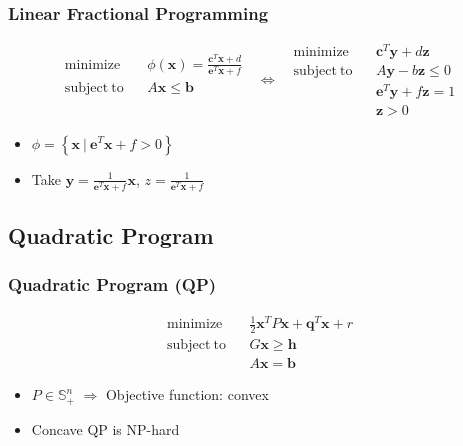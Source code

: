 \subsubsection*{Linear Fractional Programming}
$$ \begin{aligned}
    \mathrm{minimize}~~&~~\phi(\mathbf{x}) = \frac {\mathbf{c}^T\mathbf{x} + d} {\mathbf{e}^T \mathbf{x} + f} \\
    \mathrm{subject~to}~~&~~A\mathbf{x} \leq \mathbf{b} \\ {} \\ {}
\end{aligned}~~~\Leftrightarrow~~~\begin{aligned}
    \mathrm{minimize}~~&~~\mathbf{c}^T\mathbf{y} + d\mathbf{z} \\
    \mathrm{subject~to}~~&~~A\mathbf{y} - b\mathbf{z} \leq 0 \\
        &~~\mathbf{e}^T\mathbf{y} + f\mathbf{z} = 1\\
        &~~\mathbf{z} > 0
\end{aligned} $$
\begin{itemize}
    \item $\mathcal{\phi} = \left\{\mathbf{x}~|~\mathbf{e}^T\mathbf{x} + f > 0 \right\}$
    \item Take $\mathbf{y} = \frac 1 {\mathbf{e}^T\mathbf{x} + f}\mathbf{x}$, $z = \frac 1 {\mathbf{e}^T\mathbf{x} + f}$
\end{itemize}

\subsection{Quadratic Program}

\subsubsection*{Quadratic Program (QP)}
$$ \begin{aligned}
    \mathrm{minimize}~~&~~\frac 1 2 \mathbf{x}^TP\mathbf{x} + \mathbf{q}^T\mathbf{x} + r \\
    \mathrm{subject~to}~~&~~G\mathbf{x} \geq \mathbf{h} \\
        &~~A\mathbf{x} = \mathbf{b}
\end{aligned} $$
\begin{itemize}
    \item $P \in \mathbb{S}^n_+$ $\Rightarrow$ Objective function: convex
    \item Concave QP is NP-hard
\end{itemize}

